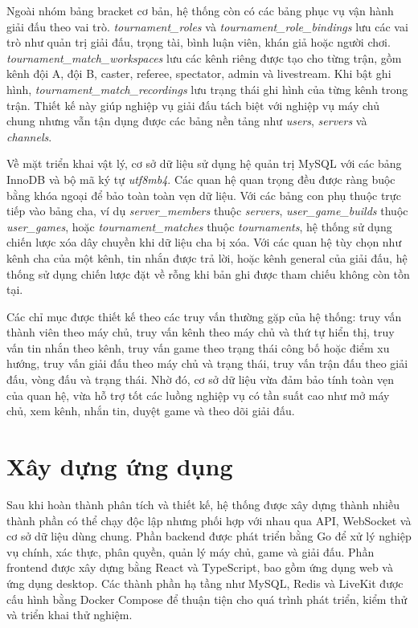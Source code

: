 Ngoài nhóm bảng bracket cơ bản, hệ thống còn có các bảng phục vụ vận hành giải đấu theo vai trò. \textit{tournament\_roles} và \textit{tournament\_role\_bindings} lưu các vai trò như quản trị giải đấu, trọng tài, bình luận viên, khán giả hoặc người chơi. \textit{tournament\_match\_workspaces} lưu các kênh riêng được tạo cho từng trận, gồm kênh đội A, đội B, caster, referee, spectator, admin và livestream. Khi bật ghi hình, \textit{tournament\_match\_recordings} lưu trạng thái ghi hình của từng kênh trong trận. Thiết kế này giúp nghiệp vụ giải đấu tách biệt với nghiệp vụ máy chủ chung nhưng vẫn tận dụng được các bảng nền tảng như \textit{users}, \textit{servers} và \textit{channels}.

Về mặt triển khai vật lý, cơ sở dữ liệu sử dụng hệ quản trị MySQL với các bảng InnoDB và bộ mã ký tự \textit{utf8mb4}. Các quan hệ quan trọng đều được ràng buộc bằng khóa ngoại để bảo toàn toàn vẹn dữ liệu. Với các bảng con phụ thuộc trực tiếp vào bảng cha, ví dụ \textit{server\_members} thuộc \textit{servers}, \textit{user\_game\_builds} thuộc \textit{user\_games}, hoặc \textit{tournament\_matches} thuộc \textit{tournaments}, hệ thống sử dụng chiến lược xóa dây chuyền khi dữ liệu cha bị xóa. Với các quan hệ tùy chọn như kênh cha của một kênh, tin nhắn được trả lời, hoặc kênh general của giải đấu, hệ thống sử dụng chiến lược đặt về rỗng khi bản ghi được tham chiếu không còn tồn tại.

Các chỉ mục được thiết kế theo các truy vấn thường gặp của hệ thống: truy vấn thành viên theo máy chủ, truy vấn kênh theo máy chủ và thứ tự hiển thị, truy vấn tin nhắn theo kênh, truy vấn game theo trạng thái công bố hoặc điểm xu hướng, truy vấn giải đấu theo máy chủ và trạng thái, truy vấn trận đấu theo giải đấu, vòng đấu và trạng thái. Nhờ đó, cơ sở dữ liệu vừa đảm bảo tính toàn vẹn của quan hệ, vừa hỗ trợ tốt các luồng nghiệp vụ có tần suất cao như mở máy chủ, xem kênh, nhắn tin, duyệt game và theo dõi giải đấu.

\section{Xây dựng ứng dụng}
\label{section:4.3}

Sau khi hoàn thành phân tích và thiết kế, hệ thống được xây dựng thành nhiều thành phần có thể chạy độc lập nhưng phối hợp với nhau qua API, WebSocket và cơ sở dữ liệu dùng chung. Phần backend được phát triển bằng Go để xử lý nghiệp vụ chính, xác thực, phân quyền, quản lý máy chủ, game và giải đấu. Phần frontend được xây dựng bằng React và TypeScript, bao gồm ứng dụng web và ứng dụng desktop. Các thành phần hạ tầng như MySQL, Redis và LiveKit được cấu hình bằng Docker Compose để thuận tiện cho quá trình phát triển, kiểm thử và triển khai thử nghiệm.

